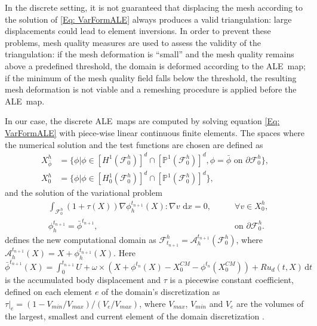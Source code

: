 \documentclass[graybox]{svmult}
\newcommand{\Fluid}{\mathcal{F}} %
\newcommand{\Alemap}{\mathcal{A}} %
\newcommand{\ALE}{ALE} %
\newcommand{\tvel}{U} %
\newcommand{\angvel}{\omega} %
\newcommand{\CompDomain}{\Fluid}
\newcommand{\dx}{\, \mathrm{d}x}
\begin{document}
In the discrete setting, it is not guaranteed that displacing the mesh according to the solution of \eqref{Eq: VarFormALE} always produces a valid triangulation: large displacements could lead to element inversions.
In order to prevent these problems, mesh quality measures \cite{Field2000} are used to assess the validity of the triangulation: if the mesh deformation is ``small'' and the mesh quality remains above a predefined threshold, the domain is deformed according to the \ALE\ map; if the minimum of the mesh quality field falls below the threshold, the resulting mesh deformation is not viable and a remeshing procedure is applied before the \ALE\ map.

In our case, the discrete \ALE\ maps are computed by solving equation \eqref{Eq: VarFormALE} with piece-wise linear continuous finite elements. The spaces where the numerical solution and the test functions are chosen are defined as
\begin{equation}
	\begin{aligned}
		X_{\bar{\phi}}^h &= \{  \phi \big| \phi \in [H^1(\CompDomain^h_{0})]^d\cap [\mathbb{P}^1(\CompDomain^h_{0})]^d, \phi=\bar{\phi} \text{ on $\partial \CompDomain^h_{0}$}\},\\
		X_0^h &= \{  \phi \big| \phi \in [H^1_0(\CompDomain^h_{0})]^d\cap [\mathbb{P}^1(\CompDomain^h_{0})]^d\},
	\end{aligned}
\end{equation}
and the solution of the variational problem 
	\begin{equation}
		\begin{aligned}
			&\int_{\CompDomain^h_{0}} (1+\tau(X))\nabla \phi^{t_{n+1}}_h (X)  : \nabla v \,\dx= 0, \qquad &\text{$\forall v \in X_0^h$},
			\\
			&\mathcal{\phi}_h^{t_{n+1}}= \bar{\phi}^{t_{n+1}}, &\text{on $\partial \CompDomain^h_{0}$}.
		\end{aligned}
	\end{equation}
defines the new computational domain as $\CompDomain^h_{t_{n+1}}=\Alemap_h^{t_{n+1}}(\CompDomain^h_{0})$, where $\Alemap_h^{t_{n+1}}(X) = X + \phi_h^{t_{n+1}}(X)$. 
Here $\bar{\phi}^{t_{n+1}}(X) = \int_{0}^{t_{n+1}}\tvel + \angvel\times(X+\phi^{t_n}(X)-X^{CM}_{0}-\phi^{t_n}(X^{CM}_{0})) + Ru_d(t,X)\, \mathrm{d}t$ is the accumulated body displacement and $\tau$ is a piecewise constant coefficient, defined on each element $e$ of the domain's discretization as $ \tau\big |_e=(1-V_{min}/V_{max})/(V_e/V_{max})$, where $V_{max}$, $V_{min}$  and $V_e$ are the volumes of the largest, smallest and current element of the domain discretization \cite{kanchi_3d_2007}.
\end{document}
